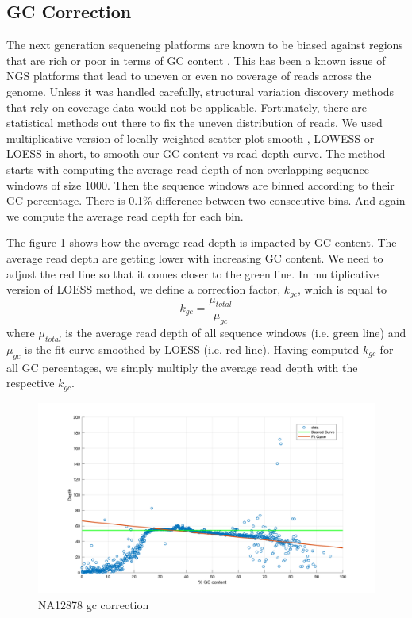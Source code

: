 \subsection{GC Correction}
The next generation sequencing platforms are known to be biased against regions that are rich or poor in terms of GC content \cite{smith2008rapid}. This has been a known issue of NGS platforms that lead to uneven or even no coverage of reads across the genome. Unless it was handled carefully, structural variation discovery methods that rely on coverage data would not be applicable. Fortunately, there are statistical methods out there to fix the uneven distribution of reads. We used multiplicative version of locally weighted scatter plot smooth \cite{cleveland1991computational}, LOWESS or LOESS in short, to smooth our GC content vs read depth curve. The method starts with computing the average read depth of non-overlapping sequence windows of size 1000. Then the sequence windows are binned according to their GC percentage. There is 0.1\% difference between two consecutive bins. And again we compute the average read depth for each bin.

The figure \ref{gcCorrection} shows how the average read depth is impacted by GC content. The average read depth are getting lower with increasing GC content. We need to adjust the red line so that it comes closer to the green line. In multiplicative version of LOESS method, we define a correction factor, $k_{gc}$, which is equal to $$k_{gc} = \frac{\mu_{total}}{\mu_{gc}}$$ where $\mu_{total}$ is the average read depth of all sequence windows (i.e. green line) and $\mu_{gc}$ is the fit curve smoothed by LOESS (i.e. red line). Having computed $k_{gc}$ for all GC percentages, we simply multiply the average read depth with the respective $k_{gc}$.
\begin{figure}[ht]
    \centering
    \includegraphics[scale=0.25]{images/gcCorrection.png}
    \caption{NA12878 gc correction}
    \label{gcCorrection}
\end{figure}

